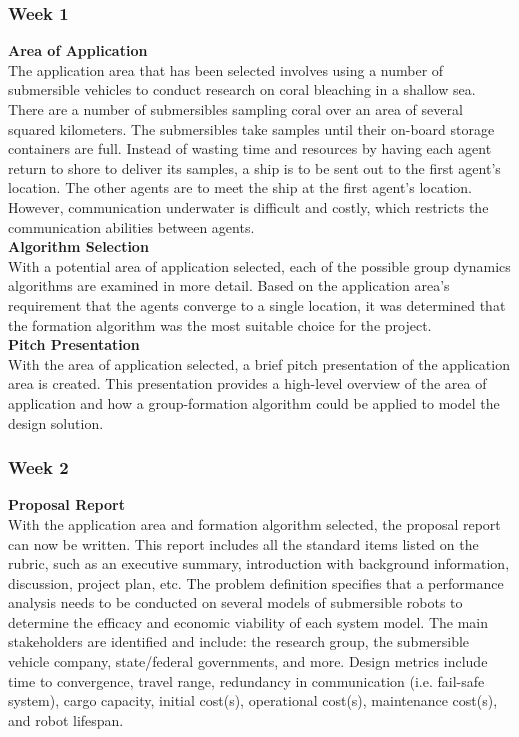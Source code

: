 \documentclass[../CourseManual.tex]{subfiles}
\begin{document}
    \subsubsection{Week 1} \label{Week 1: Formation}
        \textbf{Area of Application}\\
        The application area that has been selected involves using a number of submersible vehicles to conduct research on coral bleaching in a shallow sea. There are a number of submersibles sampling coral over an area of several squared kilometers. The submersibles take samples until their on-board storage containers are full. Instead of wasting time and resources by having each agent return to shore to deliver its samples, a ship is to be sent out to the first agent’s location. The other agents are to meet the ship at the first agent's location. However, communication underwater is difficult and costly, which restricts the communication abilities between agents.\\

        \textbf{Algorithm Selection}\\
        With a potential area of application selected, each of the possible group dynamics algorithms are examined in more detail. Based on the application area's requirement that the agents converge to a single location, it was determined that the formation algorithm was the most suitable choice for the project.\\

        \textbf{Pitch Presentation}\\
        With the area of application selected, a brief pitch presentation of the application area is created. This presentation provides a high-level overview of the area of application and how a group-formation algorithm could be applied to model the design solution. 

    \subsubsection{Week 2} \label{Week 2: Formation}
        \textbf{Proposal Report}\\
        With the application area and formation algorithm selected, the proposal report can now be written. This report includes all the standard items listed on the rubric, such as an executive summary, introduction with background information, discussion, project plan, etc. The problem definition specifies that a performance analysis needs to be conducted on several models of submersible robots to determine the efficacy and economic viability of each system model. The main stakeholders are identified and include: the research group, the submersible vehicle company, state/federal governments, and more. Design metrics include time to convergence, travel range, redundancy in communication (i.e. fail-safe system), cargo capacity, initial cost(s), operational cost(s), maintenance cost(s), and robot lifespan. \\
\end{document}
